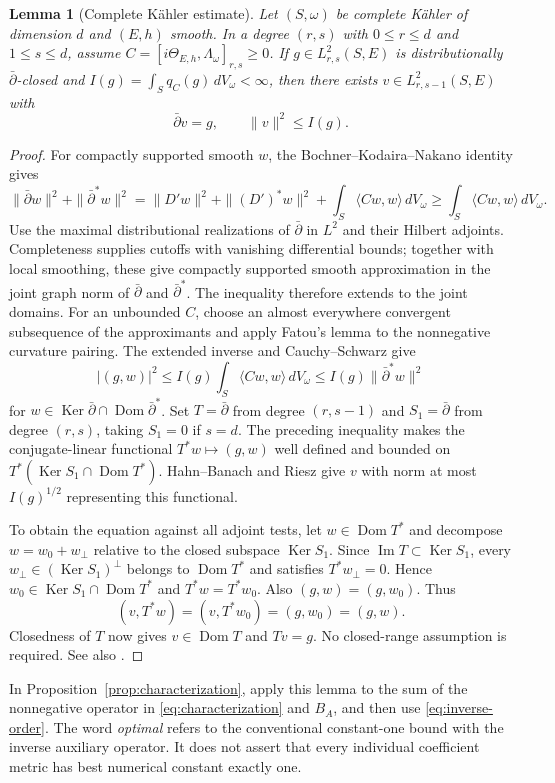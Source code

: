 \documentclass[11pt,reqno]{amsart}
\numberwithin{equation}{section}
\newtheorem{lemma}[theorem]{Lemma}
\theoremstyle{definition}
\theoremstyle{remark}
\newcommand{\db}{\bar\partial}
\newcommand{\Ker}{\operatorname{Ker}}
\newcommand{\im}{\operatorname{Im}}
\newcommand{\ip}[2]{\langle #1,#2\rangle}
\begin{document}
\begin{lemma}[Complete K\"ahler estimate]\label{lem:complete-estimate}
Let $(S,\omega)$ be complete K\"ahler of dimension $d$ and $(E,h)$ smooth. In a degree $(r,s)$ with $0\leq r\leq d$ and $1\leq s\leq d$, assume
$C=[i\Theta_{E,h},\Lambda_\omega]_{r,s}\geq0$.
If $g\in L^2_{r,s}(S,E)$ is distributionally $\db$-closed and
$I(g)=\int_Sq_C(g)\,dV_\omega<\infty$, then there exists
$v\in L^2_{r,s-1}(S,E)$ with
\[
 \db v=g,\qquad \|v\|^2\leq I(g).
\]
\end{lemma}
\begin{proof}
For compactly supported smooth $w$, the Bochner--Kodaira--Nakano identity gives
\[
 \|\db w\|^2+\|\db^*w\|^2
 =\|D'w\|^2+\|(D')^*w\|^2+\int_S\ip{Cw}{w}\,dV_\omega
 \geq\int_S\ip{Cw}{w}\,dV_\omega.
\]
Use the maximal distributional realizations of $\db$ in $L^2$ and their Hilbert adjoints. Completeness supplies cutoffs with vanishing differential bounds; together with local smoothing, these give compactly supported smooth approximation in the joint graph norm of $\db$ and $\db^*$. The inequality therefore extends to the joint domains. For an unbounded $C$, choose an almost everywhere convergent subsequence of the approximants and apply Fatou's lemma to the nonnegative curvature pairing. The extended inverse and Cauchy--Schwarz give
\[
 |(g,w)|^2\leq I(g)\int_S\ip{Cw}{w}\,dV_\omega
 \leq I(g)\|\db^*w\|^2
\]
for $w\in\Ker\db\cap\operatorname{Dom}\db^*$.
Set $T=\db$ from degree $(r,s-1)$ and $S_1=\db$ from degree $(r,s)$, taking $S_1=0$ if $s=d$. The preceding inequality makes the conjugate-linear functional $T^*w\mapsto(g,w)$ well defined and bounded on $T^*(\Ker S_1\cap\operatorname{Dom}T^*)$. Hahn--Banach and Riesz give $v$ with norm at most $I(g)^{1/2}$ representing this functional.

To obtain the equation against all adjoint tests, let $w\in\operatorname{Dom}T^*$ and decompose $w=w_0+w_\perp$ relative to the closed subspace $\Ker S_1$. Since $\im T\subset\Ker S_1$, every $w_\perp\in(\Ker S_1)^\perp$ belongs to $\operatorname{Dom}T^*$ and satisfies $T^*w_\perp=0$. Hence $w_0\in\Ker S_1\cap\operatorname{Dom}T^*$ and $T^*w=T^*w_0$. Also $(g,w)=(g,w_0)$. Thus
\[
 (v,T^*w)=(v,T^*w_0)=(g,w_0)=(g,w).
\]
Closedness of $T$ now gives $v\in\operatorname{Dom}T$ and $Tv=g$. No closed-range assumption is required. See also \cite[Chapters 4--5]{Dem12}.
\end{proof}

In Proposition~\ref{prop:characterization}, apply this lemma to the sum of the nonnegative operator in \eqref{eq:characterization} and $B_A$, and then use \eqref{eq:inverse-order}. The word \emph{optimal} refers to the conventional constant-one bound with the inverse auxiliary operator. It does not assert that every individual coefficient metric has best numerical constant exactly one.
\end{document}
